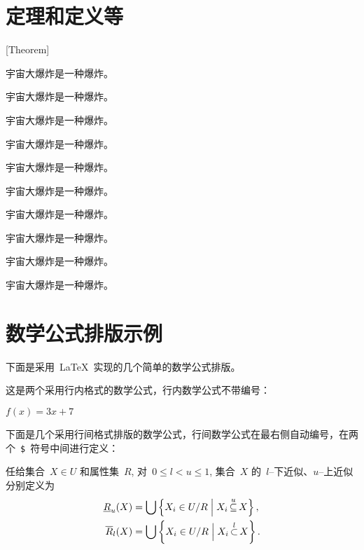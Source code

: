 \section{定理和定义等}[Theorem]
\begin{theorem}
  宇宙大爆炸是一种爆炸。
\end{theorem}
\begin{definition}[（霍金）]
  宇宙大爆炸是一种爆炸。
\end{definition}
\begin{assumption}
  宇宙大爆炸是一种爆炸。
\end{assumption}
\begin{lemma}
  宇宙大爆炸是一种爆炸。
\end{lemma}
\begin{corollary}
  宇宙大爆炸是一种爆炸。
\end{corollary}
\begin{exercise}
  宇宙大爆炸是一种爆炸。
\end{exercise}
\begin{problem}
宇宙大爆炸是一种爆炸。
\end{problem}
\begin{remark}
  宇宙大爆炸是一种爆炸。
\end{remark}
\begin{axiom}[（爱因斯坦）]
  宇宙大爆炸是一种爆炸。
\end{axiom}
\begin{conjecture}
  宇宙大爆炸是一种爆炸。
\end{conjecture}

\section{数学公式排版示例}

下面是采用~\LaTeX~实现的几个简单的数学公式排版。

这是两个采用行内格式的数学公式，行内数学公式不带编号：

$f(x) = 3x + 7$

下面是几个采用行间格式排版的数学公式，行间数学公式在最右侧自动编号，在两个~\verb|$|~符号中间进行定义：

\begin{definition}
  任给集合~$X \in U$ 和属性集~$R$, 对~$0\leqslant l < u \leqslant 1$,
  集合~$X$ 的~$l${--}下近似、$u${--}上近似分别定义为
  \begin{align}
    \underline {R} _u (X) & =  \bigcup \left\{ {X_i  \in U/R\Bigm|X_i \mathop  \subseteq \limits^u  X} \right\}, \\
    \overline {R} _l (X)  & =  \bigcup \left\{ {X_i  \in U/R\Bigm|X_i \mathop  \subset \limits^l X} \right\}.
  \end{align}
\end{definition}

